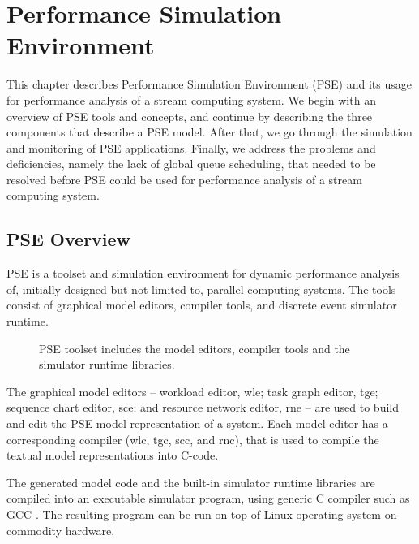 \chapter{Performance Simulation Environment}
\label{chapter:performance-simulation-environment}

This chapter describes Performance Simulation Environment (PSE) and its usage for performance analysis of a stream computing system. We begin with an overview of PSE tools and concepts, and continue by describing the three components that describe a PSE model. After that, we go through the simulation and monitoring of PSE applications. Finally, we address the problems and deficiencies, namely the lack of global queue scheduling, that needed to be resolved before PSE could be used for performance analysis of a stream computing system.

\section{PSE Overview}
\label{sec:pse-overview}

PSE is a toolset and simulation environment for dynamic performance analysis of, initially designed but not limited to, parallel computing systems. The tools consist of graphical model editors, compiler tools, and discrete event simulator runtime.

\begin{figure}[ht]
  \begin{center}
    \caption{PSE toolset includes the model editors, compiler tools and the simulator runtime libraries.}
    \label{fig:pse-toolset}
  \end{center}
\end{figure}

The graphical model editors -- workload editor, wle; task graph editor, tge; sequence chart editor, sce; and resource network editor, rne -- are used to build and edit the PSE model representation of a system. Each model editor has a corresponding compiler (wlc, tgc, scc, and rnc), that is used to compile the textual model representations into C-code.

The generated model code and the built-in simulator runtime libraries are compiled into an executable simulator program, using generic C compiler such as GCC \cite{stallman:2009:gcc}. The resulting program can be run on top of Linux operating system on commodity hardware.

